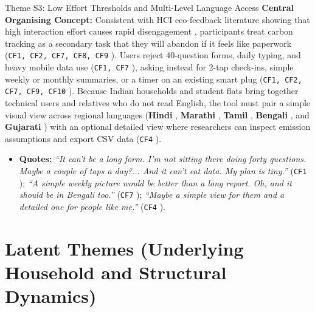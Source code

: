 \documentclass[12pt, a4paper]{article}
\begin{document}
\begin{semanticcard}{Theme S3: Low Effort Thresholds and Multi-Level Language Access}
\textbf{Central Organising Concept:} Consistent with HCI eco-feedback literature showing that high interaction effort causes rapid disengagement \cite{froehlich2010, hoffmann2024, malan2020}, participants treat carbon tracking as a secondary task that they will abandon if it feels like paperwork (\texttt{CF1, CF2, CF7, CF8, CF9} \cite{cf1, cf2, cf7, cf8, cf9}). Users reject 40-question forms, daily typing, and heavy mobile data use (\texttt{CF1, CF7} \cite{cf1, cf7}), asking instead for 2-tap check-ins, simple weekly or monthly summaries, or a timer on an existing smart plug (\texttt{CF1, CF2, CF7, CF9, CF10} \cite{cf1, cf2, cf7, cf9, cf10}). Because Indian households and student flats bring together technical users and relatives who do not read English, the tool must pair a simple visual view across regional languages (\textbf{Hindi} \cite{cf1, cf3, cf4, cf8}, \textbf{Marathi} \cite{cf1}, \textbf{Tamil} \cite{cf4}, \textbf{Bengali} \cite{cf7}, and \textbf{Gujarati} \cite{cf10}) with an optional detailed view where researchers can inspect emission assumptions and export CSV data (\texttt{CF4} \cite{cf4}).
\begin{itemize}
    \item \textbf{Quotes:} \textit{``It can't be a long form. I'm not sitting there doing forty questions. Maybe a couple of taps a day?... And it can't eat data. My plan is tiny.''} (\texttt{CF1} \cite{cf1}); \textit{``A simple weekly picture would be better than a long report. Oh, and it should be in Bengali too.''} (\texttt{CF7} \cite{cf7}); \textit{``Maybe a simple view for them and a detailed one for people like me.''} (\texttt{CF4} \cite{cf4}).
\end{itemize}
\end{semanticcard}

\section{Latent Themes (Underlying Household and Structural Dynamics)}
\end{document}
